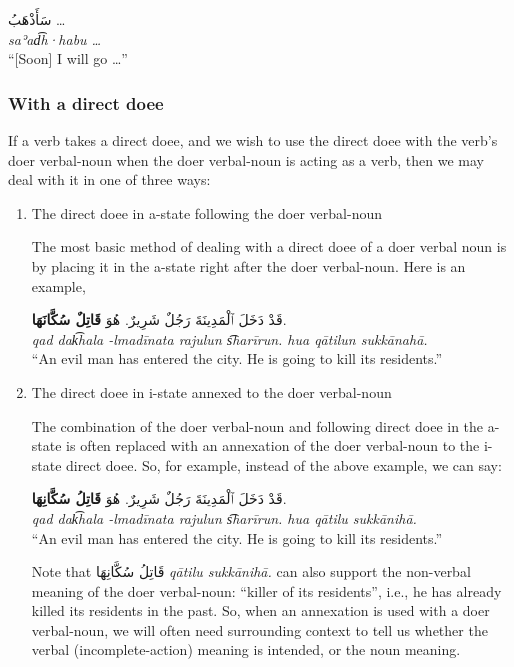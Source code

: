 \documentclass[
  10pt,
]{book}
\begin{document}
\foreignlanguage{arabic}{سَأَذْهَبُ \ldots{}}\\
\emph{saʾad͡h·habu \ldots{}}\\
\enquote{{[}Soon{]} I will go \ldots{}}

\subsubsection{With a direct doee}\label{with-a-direct-doee-1}

If a verb takes a direct doee, and we wish to use the direct doee with the verb's doer verbal-noun when the doer verbal-noun is acting as a verb, then we may deal with it in one of three ways:

\begin{enumerate}
\def\labelenumi{\arabic{enumi}.}
\item
  The direct doee in a-state following the doer verbal-noun

  The most basic method of dealing with a direct doee of a doer verbal noun is by placing it in the a-state right after the doer verbal-noun. Here is an example,

  \foreignlanguage{arabic}{قَدْ دَخَلَ ٱلْمَدِينَةَ رَجُلٌ شَرِيرٌ. هُوَ \textbf{قَاتِلٌ سُكَّانَهَا}.}\\
  \emph{qad dak͡hala -lmadīnata rajulun s͡harīrun. hua qātilun sukkānahā.}\\
  \enquote{An evil man has entered the city. He is going to kill its residents.}
\item
  The direct doee in i-state annexed to the doer verbal-noun

  The combination of the doer verbal-noun and following direct doee in the a-state is often replaced with an annexation of the doer verbal-noun to the i-state direct doee. So, for example, instead of the above example, we can say:

  \foreignlanguage{arabic}{قَدْ دَخَلَ ٱلْمَدِينَةَ رَجُلٌ شَرِيرٌ. هُوَ \textbf{قَاتِلُ سُكَّانِهَا}.}\\
  \emph{qad dak͡hala -lmadīnata rajulun s͡harīrun. hua qātilu sukkānihā.}\\
  \enquote{An evil man has entered the city. He is going to kill its residents.}

  Note that \foreignlanguage{arabic}{قَاتِلُ سُکَّانِهَا} \emph{qātilu sukkānihā.} can also support the non-verbal meaning of the doer verbal-noun: \enquote{killer of its residents}, i.e., he has already killed its residents in the past. So, when an annexation is used with a doer verbal-noun, we will often need surrounding context to tell us whether the verbal (incomplete-action) meaning is intended, or the noun meaning.


\end{enumerate}
\end{document}
